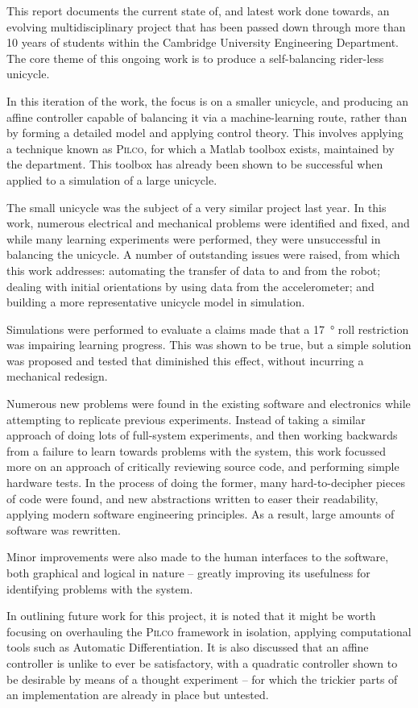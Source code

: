 \documentclass[main.tex]{subfiles}
\begin{document}
\normalsize
This report documents the current state of, and latest work done towards, an evolving multidisciplinary project that has been passed down through more than 10 years of students within the Cambridge University Engineering Department. The core theme of this ongoing work is to produce a self-balancing rider-less unicycle.

In this iteration of the work, the focus is on a smaller unicycle, and producing an affine controller capable of balancing it via a machine-learning route, rather than by forming a detailed model and applying control theory. This involves applying a technique known as \textsc{Pilco}, for which a Matlab toolbox exists, maintained by the department. This toolbox has already been shown to be successful when applied to a simulation of a large unicycle.

The small unicycle was the subject of a very similar project last year. In this work, numerous electrical and mechanical problems were identified and fixed, and while many learning experiments were performed, they were unsuccessful in balancing the unicycle. A number of outstanding issues were raised, from which this work addresses:
automating the transfer of data to and from the robot;
dealing with initial orientations by using data from the accelerometer;
and building a more representative unicycle model in simulation.

Simulations were performed to evaluate a claims made that a \SI{17}{\degree} roll restriction was impairing learning progress. This was shown to be true, but a simple solution was proposed and tested that diminished this effect, without incurring a mechanical redesign.

Numerous new problems were found in the existing software and electronics while attempting to replicate previous experiments.
Instead of taking a similar approach of doing lots of full-system experiments, and then working backwards from a failure to learn towards problems with the system, this work focussed more on an approach of critically reviewing source code, and performing simple hardware tests.
In the process of doing the former, many hard-to-decipher pieces of code were found, and new abstractions written to easer their readability, applying modern software engineering principles.
As a result, large amounts of software was rewritten.

Minor improvements were also made to the human interfaces to the software, both graphical and logical in nature -- greatly improving its usefulness for identifying problems with the system.

In outlining future work for this project, it is noted that it might be worth focusing on overhauling the \textsc{Pilco} framework in isolation, applying computational tools such as Automatic Differentiation. It is also discussed that an affine controller is unlike to ever be satisfactory, with a quadratic controller shown to be desirable by means of a thought experiment -- for which the trickier parts of an implementation are already in place but untested.
\end{document}
